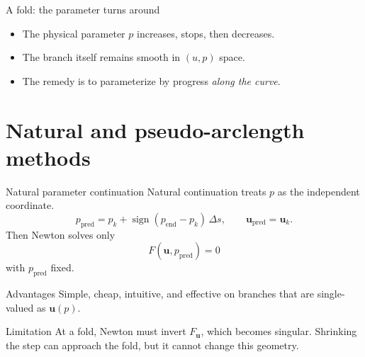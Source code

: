 \documentclass[aspectratio=169,10pt]{beamer}
\newcommand{\state}{\bm{u}}
\begin{document}
\begin{frame}{A fold: the parameter turns around}
\centering
{}
\begin{itemize}
  \item The physical parameter $p$ increases, stops, then decreases.
  \item The branch itself remains smooth in $(u,p)$ space.
  \item The remedy is to parameterize by progress \emph{along the curve}.
\end{itemize}
\end{frame}

\section{Natural and pseudo-arclength methods}

\begin{frame}{Natural parameter continuation}
Natural continuation treats $p$ as the independent coordinate.
\[
  p_{\mathrm{pred}}=p_k+\operatorname{sign}(p_{\mathrm{end}}-p_k)\,\Delta s,
  \qquad \state_{\mathrm{pred}}=\state_k.
\]
Then Newton solves only
\[
  F(\state,p_{\mathrm{pred}})=0
\]
with $p_{\mathrm{pred}}$ fixed.
\begin{block}{Advantages}
Simple, cheap, intuitive, and effective on branches that are single-valued as $\state(p)$.
\end{block}
\begin{alertblock}{Limitation}
At a fold, Newton must invert $F_{\state}$, which becomes singular. Shrinking the step can approach the fold, but it cannot change this geometry.
\end{alertblock}
\end{frame}
\end{document}
